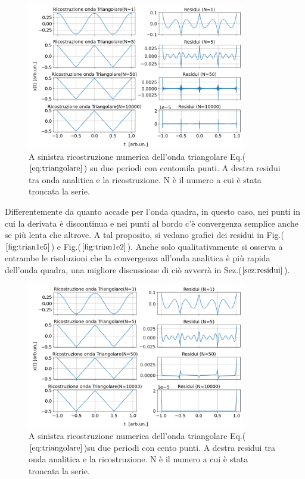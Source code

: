 \documentclass{article}
\begin{document}
        \begin{figure}[H]
            \centering
            \includegraphics[width=0.85\textwidth]{foutriawave1e5.png} %
            \caption{A sinistra ricostruzione numerica dell'onda triangolare
             Eq.($\ref{eq:triangolare}$) su due periodi con centomila punti.
            A destra residui tra onda analitica e la ricostruzione.
            N è il numero a cui è stata troncata la serie. }
            \label{fig:trian1e5}
        \end{figure}
        \noindent Differentemente da quanto accade per l'onda quadra, 
        in questo caso, nei punti in cui la derivata è discontinua 
        e nei punti al bordo c'è convergenza semplice anche se più lenta 
        che altrove.
        A tal proposito, si vedano grafici dei residui in Fig.($\ref{fig:trian1e5}$) e 
        Fig.($\ref{fig:trian1e2}$).
        Anche solo qualitativamente si osserva a entrambe le risoluzioni che 
        la convergenza all'onda analitica è più rapida dell'onda quadra,
         una migliore discussione di ciò avverrà in
        Sez.($\ref{sez:residui}$).
        \begin{figure}[H]
            \centering
            \includegraphics[width=0.85\textwidth]{foutriawave1e2.png} %
            \caption{A sinistra ricostruzione numerica dell'onda triangolare
            Eq.($\ref{eq:triangolare}$)su due periodi con cento punti.
           A destra residui tra onda analitica e la ricostruzione.
           N è il numero a cui è stata troncata la serie. }
            \label{fig:trian1e2}
        \end{figure}        
        
\end{document}
